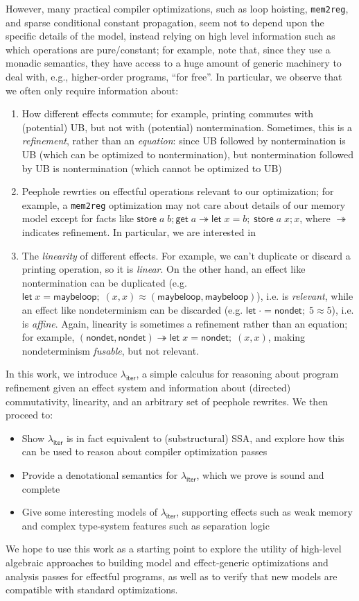 \documentclass[acmsmall,screen,review]{acmart}
\newcommand{\ms}[1]{\ensuremath{\mathsf{#1}}}
\newcommand{\letexpr}[3]{\ensuremath{\ms{let}\;#1 = #2;\;#3}}
\newcommand{\teqv}{\approx}
\newcommand{\tref}{\twoheadrightarrow}
\newcommand{\subiterexp}{\texorpdfstring{\(\lambda_{\ms{iter}}\)}{lambda-iter}}
\begin{document}
However, many practical compiler optimizations, such as loop hoisting, \texttt{mem2reg}, and sparse
conditional constant propagation, seem not to depend upon the specific details of the model, instead
relying on high level information such as which operations are pure/constant; for example,
\citet{release-acquire} note that, since they use a monadic semantics, they have access to a huge
amount of generic machinery to deal with, e.g., higher-order programs, ``for free''. In particular,
we observe that we often only require information about:
\begin{enumerate}
  \item How different effects commute; for example, printing commutes with (potential) UB, but not
  with (potential) nontermination. Sometimes, this is a \emph{refinement}, rather than an
  \emph{equation}: since UB followed by nontermination is UB (which can be optimized to
  nontermination), but nontermination followed by UB is nontermination (which cannot be optimized to
  UB)
  \item Peephole rewrties on effectful operations relevant to our optimization; for example, a
  \texttt{mem2reg} optimization may not care about details of our memory model except for facts like
  $\ms{store}\;a\;b ; \ms{get}\;a \tref \letexpr{x}{b}{\ms{store}\;a\;x ; x}$, where $\tref$
  indicates refinement. In particular, we are interested in
  \item The \emph{linearity} of different effects. For example, we can't duplicate or discard a
  printing operation, so it is \emph{linear}. On the other hand, an effect like nontermination can
  be duplicated (e.g. $\letexpr{x}{\ms{maybeloop}}{(x, x)} \teqv (\ms{maybeloop}, \ms{maybeloop})$),
  i.e. is \emph{relevant}, while an effect like nondeterminism can be discarded (e.g.
  $\letexpr{\cdot}{\ms{nondet}}{5} \teqv 5$), i.e. is \emph{affine}. Again, linearity is sometimes a
  refinement rather than an equation; for example, $(\ms{nondet}, \ms{nondet}) \tref
  \letexpr{x}{\ms{nondet}}{(x, x)}$, making nondeterminism \emph{fusable}, but not relevant.
\end{enumerate}
In this work, we introduce \subiterexp{}, a simple calculus for reasoning about program refinement
given an effect system and information about (directed) commutativity, linearity, and an arbitrary
set of peephole rewrites. We then proceed to:
\begin{itemize}
  \item Show \subiterexp{} is in fact equivalent to (substructural) SSA, and explore how this can be
  used to reason about compiler optimization passes
  \item Provide a denotational semantics for \subiterexp{}, which we prove is sound and complete
  \item Give some interesting models of \subiterexp{}, supporting effects such as weak memory and
  complex type-system features such as separation logic
\end{itemize}
We hope to use this work as a starting point to explore the utility of high-level algebraic
approaches to building model and effect-generic optimizations and analysis passes for effectful
programs, as well as to verify that new models are compatible with standard optimizations.



\end{document}

